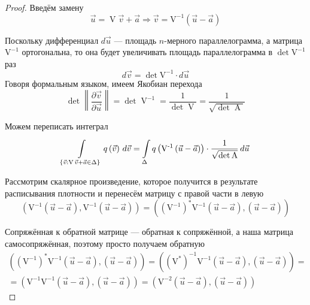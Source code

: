\begin{proof}
  Введём замену
  $$\vec{u} = \operatorname{V} \vec{v} + \vec{a}
      \Rightarrow
      \vec{v} = \operatorname{V^{-1}} \left( \vec{u} - \vec{a} \right)$$

  Поскольку дифференциал $d\vec{u}$ --- площадь $n$-мерного параллелограмма,
  а матрица $\operatorname{V^{-1}}$ ортогональна, то она будет увеличивать
  площадь параллелограмма в $\det{\operatorname{V^{-1}}}$ раз
  $$d\vec{v} = \det{\operatorname{V^{-1}}} \cdot d\vec{u}$$
  Говоря формальным языком, имеем Якобиан перехода
  \begin{equation*}
    \det{\left\| \frac{\partial\vec{v}}{\partial\vec{u}} \right\|}
    = \det{\operatorname{V}^{-1}}
    = \frac{1}{\det{\operatorname{V}}}
    = \frac{1}{\sqrt{\det{\operatorname{A}}}}
  \end{equation*}

  Можем переписать интеграл
  \begin{equation}\label{eq:gaussDencityIntegral}
  \integrall{\left\{ \vec{v}: \operatorname{V} \vec{v} + \vec{a}
      \in \Delta \right\}}{d\vec{v}}{q\left( \vec{v} \right)}
      = \integrall{\Delta}{d\vec{u}}{ q\left( \operatorname{V^{-1}}
          \left( \vec{u} - \vec{a} \right) \right)
      \cdot \frac{1}{\sqrt{\det{\operatorname{A}}}}}
  \end{equation}

  Рассмотрим скалярное произведение, которое получится в результате
  расписывания плотности и перенесём матрицу с правой части в левую
  $$\left( \operatorname{V^{-1}} \left( \vec{u} - \vec{a} \right),
    \operatorname{V^{-1}} \left( \vec{u} - \vec{a} \right)
    \right)
      = \left( \left( \operatorname{V^{-1}} \right)^*
        \operatorname{V^{-1}} \left( \vec{u} - \vec{a} \right),
        \left( \vec{u} - \vec{a} \right) \right)$$

    Сопряжённая к обратной матрице --- обратная к сопряжённой, а
    наша матрица самосопряжённая, поэтому просто получаем обратную
    \begin{align*}
        \left( \left( \operatorname{V^{-1}} \right)^*
          \operatorname{V^{-1}} \left( \vec{u} - \vec{a} \right),
          \left( \vec{u} - \vec{a} \right) \right)
        = \left( \left( \operatorname{V^*} \right)^{-1}
          \operatorname{V^{-1}} \left( \vec{u} - \vec{a} \right),
          \left( \vec{u} - \vec{a} \right) \right) = \\
        = \left( \operatorname{V^{-1}}
          \operatorname{V^{-1}} \left( \vec{u} - \vec{a} \right),
          \left( \vec{u} - \vec{a} \right) \right)
        = \left( \operatorname{V^{-2}} \left( \vec{u} - \vec{a} \right),
          \left( \vec{u} - \vec{a} \right) \right)
    \end{align*}


\end{proof}
